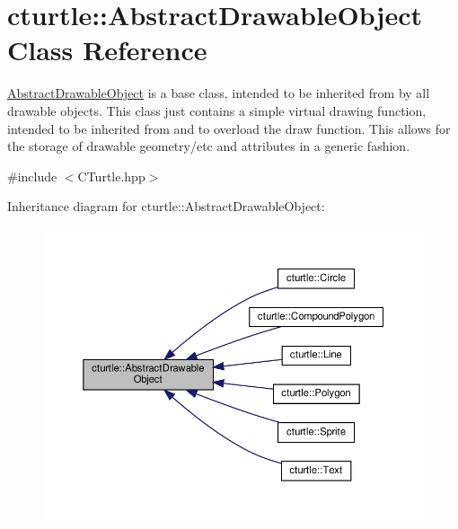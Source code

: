 \hypertarget{classcturtle_1_1AbstractDrawableObject}{}\section{cturtle\+:\+:Abstract\+Drawable\+Object Class Reference}
\label{classcturtle_1_1AbstractDrawableObject}


\hyperlink{classcturtle_1_1AbstractDrawableObject}{Abstract\+Drawable\+Object} is a base class, intended to be inherited from by all drawable objects. This class just contains a simple virtual drawing function, intended to be inherited from and to overload the draw function. This allows for the storage of drawable geometry/etc and attributes in a generic fashion.  




{\ttfamily \#include $<$C\+Turtle.\+hpp$>$}



Inheritance diagram for cturtle\+:\+:Abstract\+Drawable\+Object\+:
\nopagebreak
\begin{figure}[H]
\begin{center}
\leavevmode
\includegraphics[width=350pt]{classcturtle_1_1AbstractDrawableObject__inherit__graph}
\end{center}
\end{figure}


